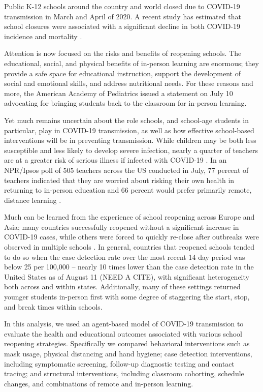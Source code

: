 \documentclass[preprint,12pt]{elsarticle}
\begin{document}
Public K-12 schools around the country and world closed due to COVID-19 transmission in March and April of 2020. A recent study has estimated that school closures were associated with a significant decline in both COVID-19 incidence and mortality \cite{auger_association_2020}. 

Attention is now focused on the risks and benefits of reopening schools. The educational, social, and physical benefits of in-person learning are enormous; they provide a safe space for educational instruction, support the development of social and emotional skills, and address nutritional needs. For these reasons and more, the American Academy of Pediatrics issued a statement \cite{AAPstatement} on July 10 advocating for bringing students back to the classroom for in-person learning. 

Yet much remains uncertain about the role schools, and school-age students in particular, play in COVID-19 transmission, as well as how effective school-based interventions will be in preventing transmission. While children may be both less susceptible and less likely to develop severe infection, nearly a quarter of teachers are at a greater risk of serious illness if infected with COVID-19 \cite{claxton_how_2020}. In an NPR/Ipsos poll of 505 teachers across the US conducted in July, 77 percent of teachers indicated that they are worried about risking their own health in returning to in-person education and 66 percent would prefer primarily remote, distance learning \cite{kamenetz_most_2020}.

Much can be learned from the experience of school reopening across Europe and Asia; many countries successfully reopened without a significant increase in COVID-19 cases, while others were forced to quickly re-close after outbreaks were observed in multiple schools \cite{vegas_reopening_2020, couzin-frankel_school_2020}. In general, countries that reopened schools tended to do so when the case detection rate over the most recent 14 day period was below 25 per 100,000 -- nearly 10 times lower than the case detection rate in the United States as of August 11 (NEED A CITE), with significant heterogeneity both across and within states. Additionally, many of these settings returned younger students in-person first with some degree of staggering the start, stop, and break times within schools.

In this analysis, we used an agent-based model of COVID-19 transmission to %
evaluate the health and educational outcomes associated with various school reopening strategies. Specifically we compared behavioral interventions such as mask usage, physical distancing and hand hygiene; case detection interventions, including symptomatic screening, follow-up diagnostic testing and contact tracing; and structural interventions, including classroom cohorting, schedule changes, and combinations of remote and in-person learning. %
\end{document}
